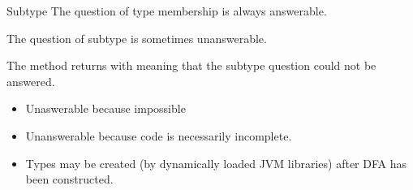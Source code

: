 \begin{frame}{Subtype}
  The question of type membership is always answerable.

  The question of subtype is sometimes unanswerable. 

  The  method returns  with
   meaning that the subtype question could not be answered.
  \begin{itemize}
  \item Unaswerable because impossible \eg {}
  \item Unanswerable because code is necessarily incomplete.
  \item Types may be created (by dynamically loaded JVM libraries) after DFA has been constructed.
  \end{itemize}

\end{frame}
